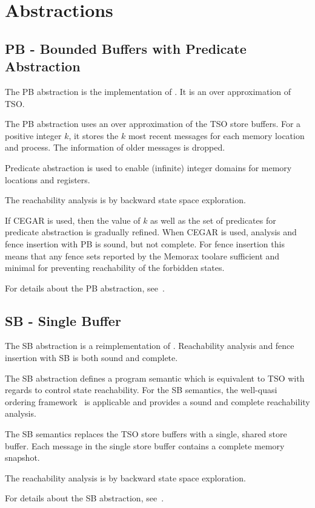 \documentclass[a4paper]{article}
\newcommand{\thetool}{the Memorax tool} %
\begin{document}
\section{Abstractions}\label{sec:abstractions}
\subsection{PB - Bounded Buffers with Predicate Abstraction}

The PB abstraction is the implementation of \cite{AACLR12SAS}. It is
an over approximation of TSO.

The PB abstraction uses an over approximation of the TSO store
buffers. For a positive integer $k$, it stores the $k$ most recent
messages for each memory location and process. The information of
older messages is dropped.

Predicate abstraction is used to enable (infinite) integer domains for
memory locations and registers.

The reachability analysis is by backward state space exploration.

If CEGAR is used, then the value of $k$ as well as the set of
predicates for predicate abstraction is gradually refined. When CEGAR
is used, analysis and fence insertion with PB is sound, but not
complete. For fence insertion this means that any fence sets reported
by \thetool are sufficient and minimal for preventing reachability of
the forbidden states.

For details about the PB abstraction, see~\cite{AACLR12SAS}.

\subsection{SB - Single Buffer}

The SB abstraction is a reimplementation of
\cite{AACLR12}. Reachability analysis and fence insertion with SB is
both sound and complete.

The SB abstraction defines a program semantic which is equivalent to
TSO with regards to control state reachability. For the SB semantics,
the well-quasi ordering framework~\cite{ACJT96} is applicable and
provides a sound and complete reachability analysis.

The SB semantics replaces the TSO store buffers with a single, shared
store buffer. Each message in the single store buffer contains a
complete memory snapshot.

The reachability analysis is by backward state space exploration.

For details about the SB abstraction, see~\cite{AACLR12}.

{}



\pagebreak
{}
{}

\end{document}
